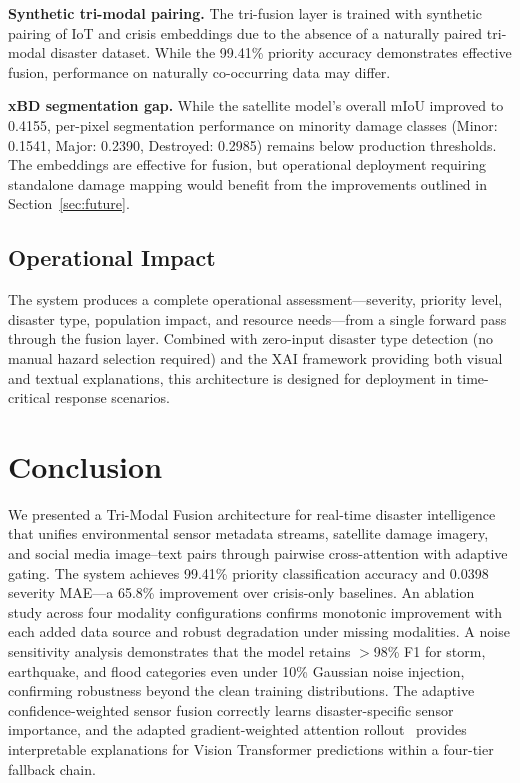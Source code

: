 \documentclass[journal]{IEEEtran}
\begin{document}
\textbf{Synthetic tri-modal pairing.} The tri-fusion layer is trained with synthetic pairing of IoT and crisis embeddings due to the absence of a naturally paired tri-modal disaster dataset. While the 99.41\% priority accuracy demonstrates effective fusion, performance on naturally co-occurring data may differ.

\textbf{xBD segmentation gap.} While the satellite model's overall mIoU improved to 0.4155, per-pixel segmentation performance on minority damage classes (Minor: 0.1541, Major: 0.2390, Destroyed: 0.2985) remains below production thresholds. The embeddings are effective for fusion, but operational deployment requiring standalone damage mapping would benefit from the improvements outlined in Section~\ref{sec:future}.

\subsection{Operational Impact}

The system produces a complete operational assessment---severity, priority level, disaster type, population impact, and resource needs---from a single forward pass through the fusion layer. Combined with zero-input disaster type detection (no manual hazard selection required) and the XAI framework providing both visual and textual explanations, this architecture is designed for deployment in time-critical response scenarios.

\section{Conclusion}

We presented a Tri-Modal Fusion architecture for real-time disaster intelligence that unifies environmental sensor metadata streams, satellite damage imagery, and social media image--text pairs through pairwise cross-attention with adaptive gating. The system achieves 99.41\% priority classification accuracy and 0.0398 severity MAE---a 65.8\% improvement over crisis-only baselines. An ablation study across four modality configurations confirms monotonic improvement with each added data source and robust degradation under missing modalities. A noise sensitivity analysis demonstrates that the model retains $>$98\% F1 for storm, earthquake, and flood categories even under 10\% Gaussian noise injection, confirming robustness beyond the clean training distributions. The adaptive confidence-weighted sensor fusion correctly learns disaster-specific sensor importance, and the adapted gradient-weighted attention rollout~\cite{chefer2021transformer} provides interpretable explanations for Vision Transformer predictions within a four-tier fallback chain.
\end{document}
